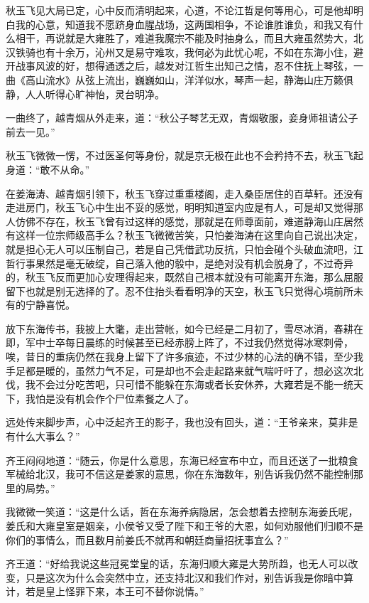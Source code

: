 秋玉飞见大局已定，心中反而清明起来，心道，不论江哲是何等用心，可是他却明白我的心意，知道我不愿跻身血腥战场，这两国相争，不论谁胜谁负，和我又有什么相干，再说就是大雍胜了，难道我魔宗不能及时抽身么，而且大雍虽然势大，北汉铁骑也有十余万，沁州又是易守难攻，我何必为此忧心呢，不如在东海小住，避开战事风波的好，想得通透之后，越发对江哲生出知己之情，忍不住抚上琴弦，一曲《高山流水》从弦上流出，巍巍如山，洋洋似水，琴声一起，静海山庄万籁俱静，人人听得心旷神怡，灵台明净。

一曲终了，越青烟从外走来，道：“秋公子琴艺无双，青烟敬服，妾身师祖请公子前去一见。”

秋玉飞微微一愣，不过医圣何等身份，就是京无极在此也不会矜持不去，秋玉飞起身道：“敢不从命。”

在姜海涛、越青烟引领下，秋玉飞穿过重重楼阁，走入桑臣居住的百草轩。还没有走进房门，秋玉飞心中生出不妥的感觉，明明知道室内应是有人，可是却又觉得那人仿佛不存在，秋玉飞曾有过这样的感觉，那就是在师尊面前，难道静海山庄居然有这样一位宗师级高手么？秋玉飞微微苦笑，只怕姜海涛在这里向自己说出决定，就是担心无人可以压制自己，若是自己凭借武功反抗，只怕会碰个头破血流吧，江哲行事果然是毫无破绽，自己落入他的彀中，是绝对没有机会脱身了，不过奇异的，秋玉飞反而更加心安理得起来，既然自己根本就没有可能离开东海，那么屈服留下也就是别无选择的了。忍不住抬头看看明净的天空，秋玉飞只觉得心境前所未有的宁静喜悦。

放下东海传书，我披上大氅，走出营帐，如今已经是二月初了，雪尽冰消，春耕在即，军中士卒每日晨练的时候甚至已经赤膀上阵了，不过我仍然觉得冰寒刺骨，唉，昔日的重病仍然在我身上留下了许多痕迹，不过少林的心法的确不错，至少我手足都是暖的，虽然力气不足，可是却也不会走起路来就气喘吁吁了，想必这次北伐，我不会过分吃苦吧，只可惜不能躲在东海或者长安休养，大雍若是不能一统天下，我怕是没有机会作个尸位素餐之人了。

远处传来脚步声，心中泛起齐王的影子，我也没有回头，道：“王爷亲来，莫非是有什么大事么？”

齐王闷闷地道：“随云，你是什么意思，东海已经宣布中立，而且还送了一批粮食军械给北汉，我可不信这是姜家的意思，你在东海数年，别告诉我仍然不能控制那里的局势。”

我微微一笑道：“这是什么话，哲在东海养病隐居，怎会想着去控制东海姜氏呢，姜氏和大雍皇室是姻亲，小侯爷又受了陛下和王爷的大恩，如何劝服他们归顺不是你们的事情么，而且数月前姜氏不就再和朝廷商量招抚事宜么？”

齐王道：“好给我说这些冠冕堂皇的话，东海归顺大雍是大势所趋，也无人可以改变，只是这次为什么会突然中立，还支持北汉和我们作对，别告诉我是你暗中算计，若是皇上怪罪下来，本王可不替你说情。”

